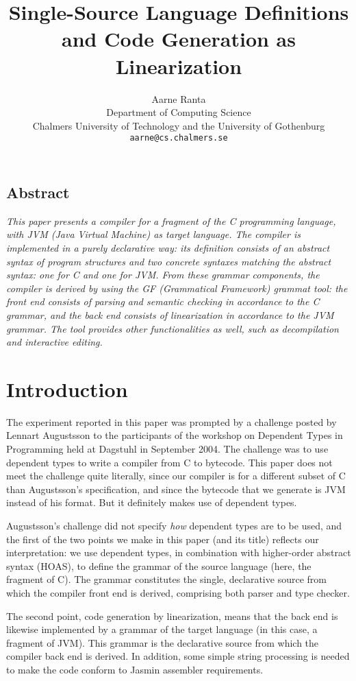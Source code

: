 \documentclass[12pt]{article}
\title{{\bf Single-Source Language Definitions and Code Generation as Linearization}}
\author{Aarne Ranta \\
  Department of Computing Science \\
  Chalmers University of Technology and the University of Gothenburg\\
  {\tt aarne@cs.chalmers.se}}
\begin{document}
\maketitle


\subsection*{Abstract}

{\em
This paper presents a compiler for a fragment of the C programming
language, with JVM (Java Virtual Machine) as target language.
The compiler is implemented in a purely declarative way:
its definition consists of an abstract syntax of program
structures and two concrete syntaxes matching the abstract
syntax: one for C and one for JVM. From these grammar components,
the compiler is derived by using the GF (Grammatical Framework)
grammat tool: the front end consists of parsing and semantic
checking in accordance to the C grammar, and the back end consists
of linearization in accordance to the JVM grammar. The tool provides
other functionalities as well, such as decompilation and interactive
editing. 
}

\section{Introduction}

The experiment reported in this paper was prompted by a challenge
posted by Lennart Augustsson to the participants of the workshop
on Dependent Types in Programming held at Dagstuhl in September 2004.
The challenge was to use dependent types to write a compiler from
C to bytecode. This paper does not meet the challenge quite literally,
since our compiler is for a different subset of C than Augustsson's
specification, and since the bytecode that we generate is JVM instead
of his format. But it definitely makes use of dependent types.

Augustsson's  challenge did not specify \textit{how} dependent
types are to be used, and the first of the two points we make in this
paper (and its title) reflects our interpretation:
we use dependent types, in combination with higher-order abstract syntax (HOAS),
to define the grammar of the source language (here, the fragment of C).
The grammar constitutes the single, declarative source from which
the compiler front end is derived, comprising both parser and type
checker.

The second point, code generation by linearization, means that the
back end is likewise implemented by a grammar of the target
language (in this case, a fragment of JVM). This grammar is the
declarative source from which the compiler back end is derived.
In addition, some simple string processing is needed to
make the code conform to Jasmin assembler requirements.
\end{document}
